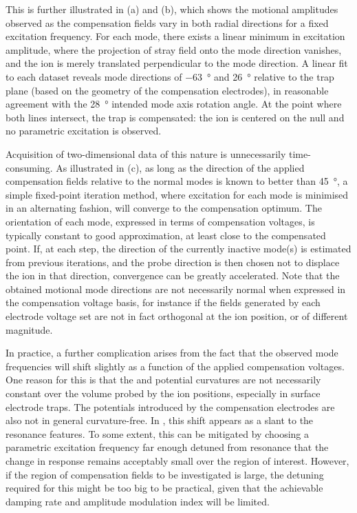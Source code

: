 \documentclass[pra,twocolumn]{revtex4-2}
\begin{document}
This is further illustrated in  (a) and (b), which shows the motional amplitudes observed as the compensation fields vary in both radial directions for a fixed excitation frequency.
For each mode, there exists a linear minimum in excitation amplitude, where the projection of stray field onto the mode direction vanishes, and the ion is merely translated perpendicular to the mode direction.
A linear fit to each dataset reveals mode directions of \SI{-63}{\degree} and \SI{26}{\degree} relative to the trap plane (based on the geometry of the compensation electrodes), in reasonable agreement with the \SI{28}{\degree} intended mode axis rotation angle.
At the point where both lines intersect, the trap is compensated: the ion is centered on the \RF{} null and no parametric excitation is observed.

Acquisition of two-dimensional data of this nature is unnecessarily time-consuming.
As illustrated in  (c), as long as the direction of the applied compensation fields relative to the normal modes is known to better than \SI{45}{\degree}, a simple fixed-point iteration method, where excitation for each mode is minimised in an alternating fashion, will converge to the compensation optimum.
The orientation of each mode, expressed in terms of compensation voltages, is typically constant to good approximation, at least close to the compensated point.
If, at each step, the direction of the currently inactive mode(s) is estimated from previous iterations, and the probe direction is then chosen not to displace the ion in that direction, convergence can be greatly accelerated.
Note that the obtained motional mode directions are not necessarily normal when expressed in the compensation voltage basis, for instance if the fields generated by each electrode voltage set are not in fact orthogonal at the ion position, or of different magnitude.

In practice, a further complication arises from the fact that the observed mode frequencies will shift slightly as a function of the applied compensation voltages.
One reason for this is that the \DC{} and \RF{} potential curvatures are not necessarily constant over the volume probed by the ion positions, especially in surface electrode traps.
The potentials introduced by the compensation electrodes are also not in general curvature-free.
In , this shift appears as a slant to the resonance features.
To some extent, this can be mitigated by choosing a parametric excitation frequency far enough detuned from resonance that the change in response remains acceptably small over the region of interest.
However, if the region of compensation fields to be investigated is large, the detuning required for this might be too big to be practical, given that the achievable damping rate and amplitude modulation index will be limited.
\end{document}
